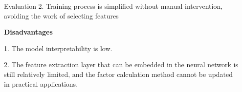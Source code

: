 \documentclass[final]{beamer}
\newlength{\sepwidth}
\newlength{\colwidth}
\newcommand{\separatorcolumn}{\begin{column}{\sepwidth}\end{column}}
\begin{document}
\begin{frame}[t]
\begin{columns}[t]
\begin{column}{\colwidth}
\begin{block}{Evaluation}
    2. Training process is simplified without manual intervention, avoiding the work of selecting features
    
    \textbf{Disadvantages}
    
    1. The model interpretability is low.
    
    2. The feature extraction layer that can be embedded in the neural network is still relatively limited, and the factor calculation method cannot be updated in practical applications.
  \end{block}
\end{column}

\separatorcolumn
\end{columns}
\end{frame}
\end{document}
